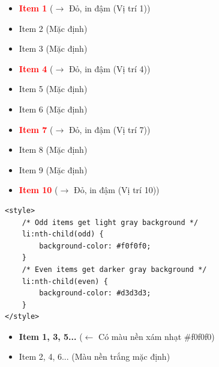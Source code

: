 \begin{browserWindow}
\sffamily\small
\begin{itemize}[leftmargin=1.5em, itemsep=2pt, parsep=0pt]
    \item \textcolor{red}{\textbf{Item 1}} {\scriptsize\textcolor{gray!60}{($\rightarrow$ Đỏ, in đậm (Vị trí 1))}}
    \item Item 2 {\scriptsize\textcolor{gray!60}{(Mặc định)}}
    \item Item 3 {\scriptsize\textcolor{gray!60}{(Mặc định)}}
    \item \textcolor{red}{\textbf{Item 4}} {\scriptsize\textcolor{gray!60}{($\rightarrow$ Đỏ, in đậm (Vị trí 4))}}
    \item Item 5 {\scriptsize\textcolor{gray!60}{(Mặc định)}}
    \item Item 6 {\scriptsize\textcolor{gray!60}{(Mặc định)}}
    \item \textcolor{red}{\textbf{Item 7}} {\scriptsize\textcolor{gray!60}{($\rightarrow$ Đỏ, in đậm (Vị trí 7))}}
    \item Item 8 {\scriptsize\textcolor{gray!60}{(Mặc định)}}
    \item Item 9 {\scriptsize\textcolor{gray!60}{(Mặc định)}}
    \item \textcolor{red}{\textbf{Item 10}} {\scriptsize\textcolor{gray!60}{($\rightarrow$ Đỏ, in đậm (Vị trí 10))}}
\end{itemize}
\end{browserWindow}

\begin{codeWindow}
\begin{lstlisting}[language=HTML5]
<style>
    /* Odd items get light gray background */
    li:nth-child(odd) {
        background-color: #f0f0f0;
    }
    /* Even items get darker gray background */
    li:nth-child(even) {
        background-color: #d3d3d3;
    }
</style>
\end{lstlisting}
\end{codeWindow}

\begin{browserWindow}
\sffamily\small
\begin{itemize}[leftmargin=1.5em, itemsep=3pt, parsep=0pt]
    \item \colorbox{gray!20}{\textbf{Item 1, 3, 5...}} {\scriptsize\textcolor{gray!60}{($\leftarrow$ Có màu nền xám nhạt \#f0f0f0)}}
    \item Item 2, 4, 6... {\scriptsize\textcolor{gray!60}{(Màu nền trắng mặc định)}}
\end{itemize}
\end{browserWindow}

